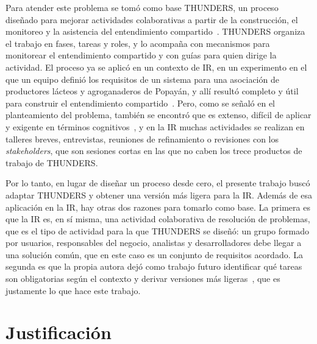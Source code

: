 \documentclass[12pt,letterpaper,oneside]{report}
\begin{document}
Para atender este problema se tomó como base THUNDERS, un proceso diseñado para
mejorar actividades colaborativas a partir de la construcción, el monitoreo y la
asistencia del entendimiento compartido~\cite{agredo2022thesis}. THUNDERS
organiza el trabajo en fases, tareas y roles, y lo acompaña con mecanismos para
monitorear el entendimiento compartido y con guías para quien dirige la
actividad. El proceso ya se aplicó en un contexto de IR, en un experimento en el
que un equipo definió los requisitos de un sistema para una asociación de
productores lácteos y agroganaderos de Popayán, y allí resultó completo y útil
para construir el entendimiento
compartido~\cite{agredo2022thesis,agredo2023strategy}. Pero, como se señaló en
el planteamiento del problema, también se encontró que es extenso, difícil de
aplicar y exigente en términos cognitivos~\cite{agredo2022exploratory}, y en la
IR muchas actividades se realizan en talleres breves, entrevistas, reuniones de
refinamiento o revisiones con los \textit{stakeholders}, que son sesiones cortas
en las que no caben los trece productos de trabajo de THUNDERS.

Por lo tanto, en lugar de diseñar un proceso desde cero, el presente trabajo
buscó adaptar THUNDERS y obtener una versión más ligera para la IR. Además de esa
aplicación en la IR, hay otras dos razones para tomarlo como base. La primera es
que la IR es, en sí misma, una actividad colaborativa de resolución de
problemas, que es el tipo de actividad para la que THUNDERS se diseñó: un grupo
formado por usuarios, responsables del negocio, analistas y desarrolladores debe
llegar a una solución común, que en este caso es un conjunto de requisitos
acordado. La segunda es que la propia autora dejó como trabajo futuro
identificar qué tareas son obligatorias según el contexto y derivar versiones
más ligeras~\cite{agredo2022thesis}, que es justamente lo que hace este trabajo.

\section{Justificación}
\end{document}
